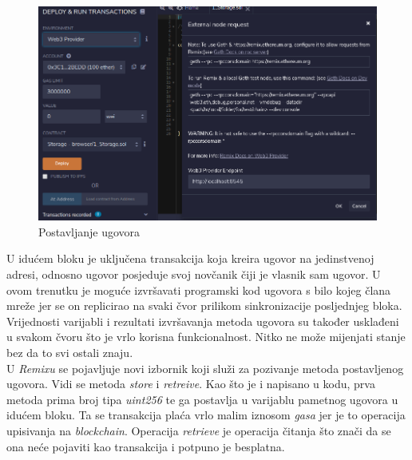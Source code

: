 \documentclass[times, utf8, zavrsni, numeric]{fer}
\begin{document}
\begin{figure}[ht]
  \includegraphics[width=\textwidth]{remixconnect.png}
  \caption{Postavljanje ugovora}
  \centering
  \vfill
\end{figure}

U idućem bloku je uključena transakcija koja kreira ugovor na jedinstvenoj adresi, odnosno ugovor posjeduje svoj novčanik čiji je vlasnik sam ugovor. 
U ovom trenutku je moguće izvršavati programski kod ugovora s bilo kojeg člana mreže jer se on replicirao na svaki čvor prilikom sinkronizacije posljednjeg bloka.
Vrijednosti varijabli i rezultati izvršavanja metoda ugovora su također usklađeni u svakom čvoru što je vrlo korisna funkcionalnost. Nitko ne može mijenjati stanje
bez da to svi ostali znaju. \\
U \emph{Remixu} se pojavljuje novi izbornik koji služi za pozivanje metoda postavljenog ugovora. Vidi se metoda \emph{store} i \emph{retreive}. Kao što je i napisano
u kodu, prva metoda prima broj tipa \emph{uint256} te ga postavlja u varijablu pametnog ugovora u idućem bloku. Ta se transakcija plaća vrlo malim iznosom \emph{gasa}
jer je to operacija upisivanja na \emph{blockchain}. Operacija \emph{retrieve} je operacija čitanja što znači da se ona neće pojaviti kao transakcija i potpuno je 
besplatna. 

\pagebreak
\end{document}
